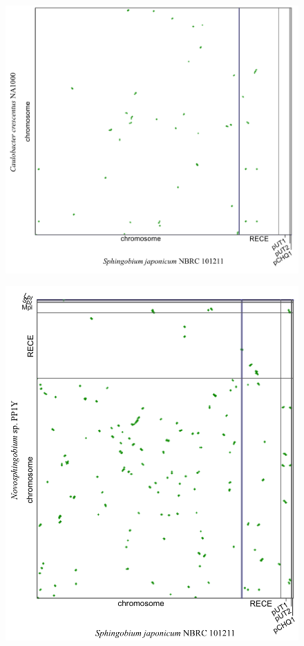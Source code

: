 \begin{figure}[H]
\begin{center}
	\begin{minipage}{0.49\textwidth}
	\includegraphics[width=\textwidth]{./img/synteny/new/fig8_6a.png}
	\label{figsyntsphing1}
	\end{minipage}
	\begin{minipage}{0.49\textwidth}
	\includegraphics[width=1.1\textwidth]{./img/synteny/new/fig8_6b.png}

\end{minipage}
\end{center}
\end{figure}
